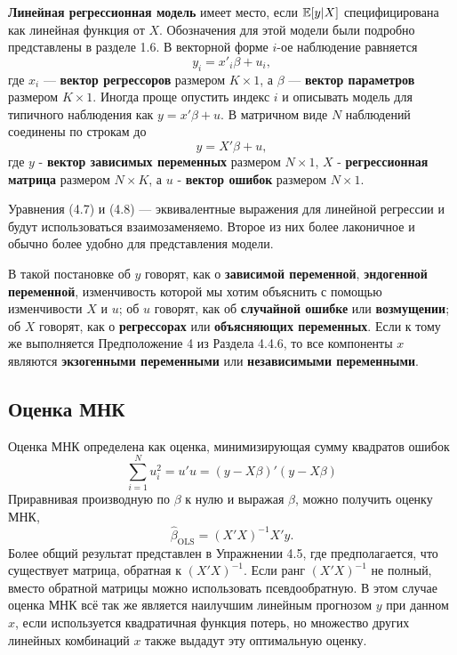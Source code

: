 \textbf{Линейная регрессионная модель} имеет место, если $\mathbb{E}{[y|X]}$ специфицирована как линейная функция от $X$. Обозначения для этой модели были подробно представлены в разделе 1.6. В векторной форме $i$-ое наблюдение равняется
\begin{equation}
y_i = x'_i \beta + u_i ,
\end{equation}
где $x_i$ --- \textbf{вектор регрессоров} размером $K\times 1$, а $\beta$ --- \textbf{вектор параметров} размером $K\times 1$. Иногда проще опустить индекс $i$ и описывать модель для типичного наблюдения как $y = x' \beta + u$. В матричном виде $N$ наблюдений соединены по строкам до  
\begin{equation}
y = X' \beta + u,
\end{equation}
где $y$ - \textbf{вектор зависимых переменных} размером  $N\times 1$, $X$ - \textbf{регрессионная матрица} размером $N\times K$, а $u$ - \textbf{вектор ошибок} размером  $N\times 1$. 

Уравнения (4.7) и (4.8) --- эквивалентные выражения для линейной регрессии и будут использоваться взаимозаменяемо. Второе из них более лаконичное и обычно более удобно для представления модели.

В такой постановке об $y$ говорят, как о \textbf{зависимой переменной}, \textbf{эндогенной переменной}, изменчивость которой мы хотим объяснить с помощью изменчивости $X$ и $u$; об $u$ говорят, как об \textbf{случайной ошибке} или \textbf{возмущении}; об $X$ говорят, как о \textbf{регрессорах} или \textbf{объясняющих переменных}. Если к тому же выполняется Предположение 4 из Раздела 4.4.6, то все компоненты $x$ являются \textbf{экзогенными переменными} или \textbf{независимыми переменными}.

\subsection{Оценка МНК}

Оценка МНК определена как оценка, минимизирующая сумму квадратов ошибок
\begin{equation}
\sum_{i=1}^N u_i^2 = u'u = (y-X\beta)'(y-X\beta)
\end{equation}
Приравнивая производную по $\beta$ к нулю и выражая $\beta$, можно получить оценку МНК,
\begin{equation}
\hat{\beta}_{\text{OLS}} = (X'X)^{-1}X'y.
\end{equation}
Более общий результат представлен в Упражнении 4.5, где предполагается, что существует матрица, обратная к $(X'X)^{-1}$. Если ранг $(X'X)^{-1}$ не полный, вместо обратной матрицы можно использовать псевдообратную. В этом случае оценка МНК всё так же является наилучшим линейным прогнозом $y$ при данном $x$, если используется квадратичная функция потерь, но множество других линейных комбинаций $x$ также выдадут эту оптимальную оценку. 

